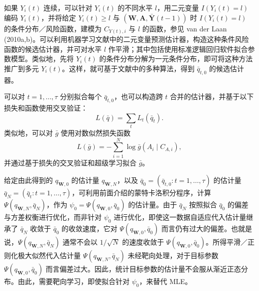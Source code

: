 如果 $Y_i(t)$ 连续，可以针对 $Y_i(t)$ 的不同水平 $l$，用二元变量 $I(Y_i(t)=l)$ 编码 $Y_i(t)$，并将给定 $Y_i(t)\ge l$ 与 $(\mathbf W,\mathbf A,\bar{\mathbf Y}(t-1))$ 时 $I(Y_i(t)=l)$ 的条件分布／风险函数，建模为 $C_{Y(t),i}$ 与 $l$ 的函数，参见 van der Laan (2010a,b)。可以利用机器学习文献中的二元变量预测估计器，构造这种条件风险函数的候选估计器，并可对水平 $l$ 作平滑；其中包括使用标准逻辑回归软件拟合参数模型。类似地，先将 $Y_i(t)$ 的条件分布分解为一元条件分布，即可将这种方法推广到多元 $Y_i(t)$。这样，就可基于文献中的多种算法，得到 $\bar q_{t,0}$ 的候选估计器。

可以对 $t=1,\ldots,\tau$ 分别拟合每个 $\bar q_{t,0}$，也可以构造跨 $t$ 合并的估计器，并基于以下损失和函数使用交叉验证：
\[
 L(\bar q)=\sum_tL_t(\bar q_t).
\]
类似地，可以对 $\bar g$ 使用对数似然损失函数
\[
 L(\bar g)=-\sum_{i=1}^N\log\bar g(A_i\mid C_{A,i}),
\]
并通过基于损失的交叉验证和超级学习拟合 $\bar g$。

给定由此得到的 $q_{\mathbf W,0}$ 的估计量 $q_{\mathbf W,N}$，以及 $\bar q_0=(\bar q_{t,0}:t=1,\ldots,\tau)$ 的估计量 $\bar q_N=(\bar q_t:t=1,\ldots,\tau)$，可利用前面介绍的蒙特卡洛积分程序，计算 $\Psi(q_{\mathbf W,N},\bar q_N)$，作为 $\psi_0=\Psi(q_{\mathbf W,0},\bar q_0)$ 的估计量。由于 $\bar q_N$ 按照拟合 $\bar q_0$ 的偏差与方差权衡进行优化，而非针对 $\psi_0$ 进行优化，即使这一数据自适应代入估计量继承了 $\bar q_N$ 收敛于 $\bar q_0$ 的收敛速度，它对 $\Psi(q_{\mathbf W,0},\bar q_0)$ 而言仍有过大的偏差。也就是说，$\Psi(q_{\mathbf W,N},\bar q_N)$ 通常不会以 $1/\sqrt N$ 的速度收敛于 $\Psi(q_{\mathbf W,0},\bar q_0)$。所得平滑／正则化极大似然代入估计量 $\Psi(q_{\mathbf W,N},\bar q_N)$ 未经靶向处理，对于目标参数 $\Psi(q_{\mathbf W,0},\bar q_0)$ 而言偏差过大。因此，统计目标参数的估计量不会服从渐近正态分布。由此，需要靶向学习，即使拟合针对 $\psi_0$，来替代 MLE。
